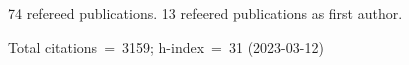 74 refereed publications. 13 refeered publications as first author.

Total citations~=~3159; h-index~=~31 (2023-03-12)